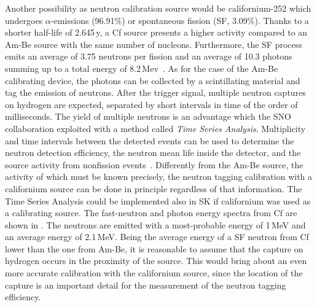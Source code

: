 Another possibility as neutron calibration source would be californium-252 which %
undergoes $\alpha$-emissions (96.91\%) or spontaneous fission (SF, 3.09\%).
Thanks to a shorter half-life of 2.645\,y, a Cf source presents a higher activity compared to an Am-Be source %
with the same number of nucleons.
Furthermore, the SF process emits an average of 3.75 neutrons per fission and an average of 10.3 photons %
summing up to a total energy of 8.2\,Mev~\cite{PhysRev.104.699}.
As for the case of the Am-Be calibrating device, the photons can be collected by a scintillating material %
and tag the emission of neutrons.
After the trigger signal, multiple neutron captures on hydrogen are expected, separated by short intervals in time %
of the order of milliseconds.
The yield of multiple neutrons is an advantage which the SNO collaboration exploited with a method %
called \emph{Time Series Analysis}.
Multiplicity and time intervals between the detected events can be used to determine the neutron detection efficiency, %
the neutron mean life inside the detector, and the source activity from nonfission events~\cite{Labranche:2004sya}.
Differently from the Am-Be source, the activity of which must be known precisely, the neutron tagging calibration %
with a californium source can be done in principle regardless of that information.
The Time Series Analysis could be implemented also in SK if californium was used as a calibrating source.
The fast-neutron and photon energy spectra from Cf are shown in . 
The neutrons are emitted with a most-probable energy of 1\,MeV and an average energy of 2.1\,MeV.
Being the average energy of a SF neutron from Cf lower than the one from Am-Be, %
it is reasonable to assume that the capture on hydrogen occurs in the proximity of the source.
This would bring about an even more accurate calibration with the californium source, %
since the location of the capture is an important detail for the measurement %
of the neutron tagging efficiency.


